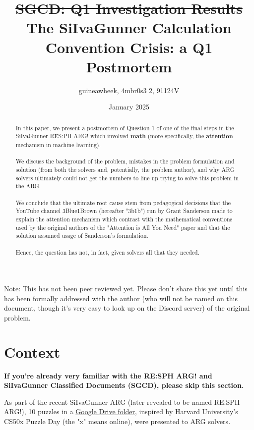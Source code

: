 \documentclass{article}
\title{\st{SGCD: Q1 Investigation Results}\\The SiIvaGunner Calculation Convention Crisis: a Q1 Postmortem}
\author{guineawheek, 4mbr0s3 2, 91124V}
\date{January 2025}
\begin{document}
\maketitle

Note: This has not been peer reviewed yet.
Please don't share this yet until this has been formally addressed with the author (who will not be named on this document, though it's very easy to look up on the Discord server) of the original problem.

\begin{abstract}
In this paper, we present a postmortem of Question 1 of one of the final steps in the SiIvaGunner RES:PH ARG! which involved \textbf{math} (more specifically, the \textbf{attention} mechanism in machine learning).
\\\\
\noindent We discuss the background of the problem, mistakes in the problem formulation and solution (from both the solvers and, potentially, the problem author), and why ARG solvers ultimately could not get the numbers to line up trying to solve this problem in the ARG. 
\\\\
We conclude that the ultimate root cause stem from pedagogical decisions that the YouTube channel 3Blue1Brown (hereafter "3b1b") run by Grant Sanderson made to explain the attention mechanism which contrast with the mathematical conventions used by the original authors of the "Attention is All You Need" paper \cite{aiayn} and that the solution assumed usage of Sanderson's formulation.
\\\\
Hence, the question has not, in fact, given solvers all that they needed.
\end{abstract}

\section{Context}
\textbf{If you're already very familiar with the RE:SPH ARG! and SiIvaGunner Classified Documents (SGCD), please skip this section.}

\vspace{1cm}

As part of the recent SiIvaGunner ARG (later revealed to be named RE:SPH ARG!), 10 puzzles in a \href{https://drive.google.com/drive/folders/1oihJsu_rC_jLYnrxSGKl3X3br3DS8OS1}{Google Drive folder}, inspired by Harvard University's CS50x Puzzle Day (the "x" means online), were presented to ARG solvers.
\end{document}
